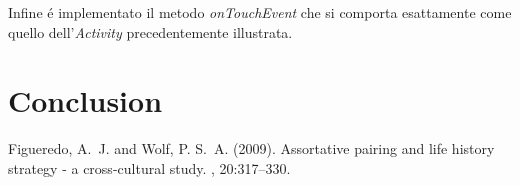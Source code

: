 \documentclass[12pt]{article} %
\begin{document}
Infine \'e implementato il metodo \textit{onTouchEvent} che si comporta esattamente come quello dell'\textit{Activity} precedentemente illustrata.












\section{Conclusion} %

\lipsum[12-13]


\begin{thebibliography}{99} %

Figueredo, A.~J. and Wolf, P. S.~A. (2009).
\newblock Assortative pairing and life history strategy - a cross-cultural
  study.
, 20:317--330.
 
\end{thebibliography}

\end{document}
